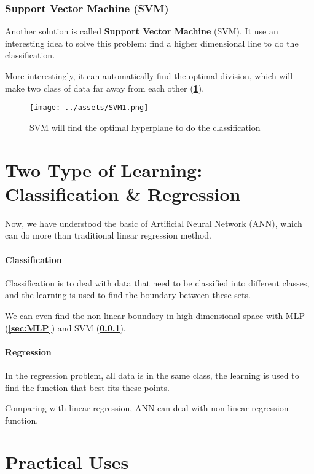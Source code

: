 \documentclass[a4paper, openany]{book}
\begin{document}
\subsubsection{Support Vector Machine (SVM)}\label{sec:SVM}

Another solution is called \textbf{Support Vector Machine} (SVM). It use an interesting idea to solve this problem: find a higher dimensional line to do the classification.

More interestingly, it can automatically find the optimal division, which will make two class of data far away from each other (\textbf{\cref{fig:SVM1}}).

\begin{figure}[htbp]
  \centering
  \texttt{[image: ../assets/SVM1.png]}
  \caption{SVM will find the optimal hyperplane to do the classification}
  \label{fig:SVM1}
\end{figure}

\section{Two Type of Learning: Classification \& Regression}

Now, we have understood the basic of Artificial Neural Network (ANN), which can do more than traditional linear regression method.

\paragraph{Classification}

Classification is to deal with data that need to be classified into different classes, and the learning is used to find the boundary between these sets.

We can even find the non-linear boundary in high dimensional space with MLP (\textbf{\cref{sec:MLP}}) and SVM (\textbf{\cref{sec:SVM}}).

\paragraph{Regression}

In the regression problem, all data is in the same class, the learning is used to find the function that best fits these points.

Comparing with linear regression, ANN can deal with non-linear regression function.

\section{Practical Uses}
\end{document}
